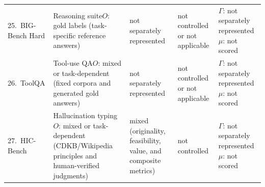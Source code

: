 \documentclass{clv2025}
\begin{document}
\begin{table}[t]
\begin{tabularx}{0.99\linewidth}{
  @{}P{0.17\textwidth}P{0.25\textwidth}
  P{0.15\textwidth}P{0.14\textwidth}Y@{}}
25.~BIG-Bench Hard \citep{suzgun_challenging_2023} & Reasoning suite\newline $O$: gold labels (task-specific reference answers) & not separately represented & not controlled or not applicable & $\Gamma$: not separately represented\newline $\mu$: not scored\\
26.~ToolQA \citep{zhuang_toolqa_2023} & Tool-use QA\newline $O$: mixed or task-dependent (fixed corpora and generated gold answers) & not separately represented & not controlled or not applicable & $\Gamma$: not separately represented\newline $\mu$: not scored\\
27.~HIC-Bench \citep{yang_hicbench_2025} & Hallucination typing\newline $O$: mixed or task-dependent (CDKB/Wikipedia principles and human-verified judgments) & mixed (originality, feasibility, value, and composite metrics) & not controlled & $\Gamma$: not separately represented\newline $\mu$: not scored\\
\bottomrule
\end{tabularx}
\end{table}
\end{document}
